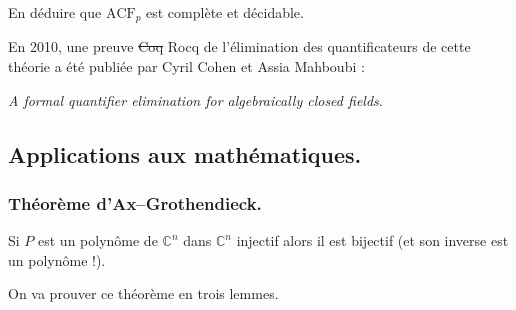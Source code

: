 \documentclass[./main]{subfiles}
\begin{document}
  \begin{exo}
    En déduire que $\mathrm{ACF}_p$ est complète et décidable.
  \end{exo}

  \begin{rmk}
    En 2010, une preuve \st{\textsf{Coq}} \textsf{Rocq} de l'élimination des quantificateurs de cette théorie a été publiée par Cyril Cohen et Assia Mahboubi :
    \begin{center}
      \textit{A formal quantifier elimination for algebraically closed fields}.
    \end{center}
  \end{rmk}

  \subsection{Applications aux mathématiques.}

  \subsubsection{Théorème d'Ax--Grothendieck.}

  \begin{thm}[Ax--Grothendieck]
    Si $P$ est un polynôme de $\mathds{C}^n$ dans $\mathds{C}^n$ injectif alors il est bijectif (et son inverse est un polynôme !).
  \end{thm}

  On va prouver ce théorème en trois lemmes.
\end{document}
